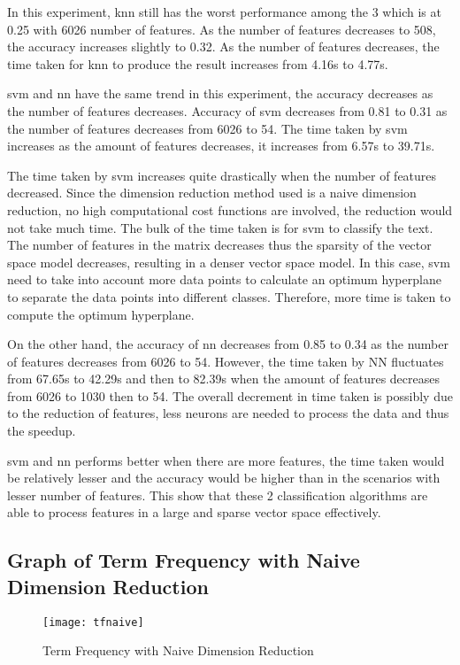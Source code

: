 In this experiment, \ac{knn} still has the worst performance among the 3 which is at 0.25 with 6026 number of features. As the number of features decreases to 508, the accuracy increases slightly to 0.32. As the number of features decreases, the time taken for \ac{knn} to produce the result increases from 4.16s to 4.77s.

\Ac{svm} and \ac{nn} have the same trend in this experiment, the accuracy decreases as the number of features decreases. Accuracy of \ac{svm} decreases from 0.81 to 0.31 as the number of features decreases from 6026 to 54. The time taken by \ac{svm} increases as the amount of features decreases, it increases from 6.57s to 39.71s.

The time taken by \ac{svm} increases quite drastically when the number of features decreased. Since the dimension reduction method used is a naive dimension reduction, no high computational cost functions are involved, the reduction would not take much time. The bulk of the time taken is for \ac{svm} to classify the text. The number of features in the matrix decreases thus the sparsity of the vector space model decreases, resulting in a denser vector space model. In this case, \ac{svm} need to take into account more data points to calculate an optimum hyperplane to separate the data points into different classes. Therefore, more time is taken to compute the optimum hyperplane.

On the other hand, the accuracy of \ac{nn} decreases from 0.85 to 0.34 as the number of features decreases from 6026 to 54. However, the time taken by NN fluctuates from 67.65s to 42.29s and then to 82.39s when the amount of features decreases from 6026 to 1030 then to 54. The overall decrement in time taken is possibly due to the reduction of features, less neurons are needed to process the data and thus the speedup.

\Ac{svm} and \ac{nn} performs better when there are more features, the time taken would be relatively lesser and the accuracy would be higher than in the scenarios with lesser number of features. This show that these 2 classification algorithms are able to process features in a large and sparse vector space effectively.

\subsection{Graph of Term Frequency with Naive Dimension Reduction}
\begin{figure} [H]
	\centering
	\texttt{[image: tfnaive]}
	\caption{Term Frequency with Naive Dimension Reduction}
	\label{fig:tfnaive}
\end{figure}

